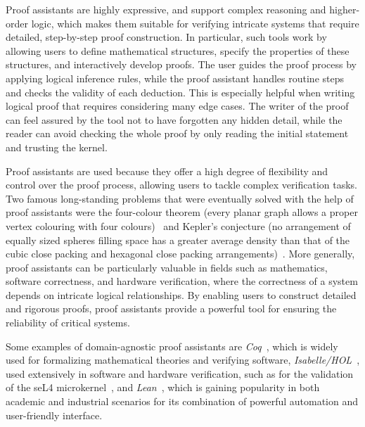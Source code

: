 Proof assistants are highly expressive, and support complex reasoning and higher-order logic, which makes them suitable for verifying intricate systems that require detailed, step-by-step proof construction. In particular, such tools work by allowing users to define mathematical structures, specify the properties of these structures, and interactively develop proofs. The user guides the proof process by applying logical inference rules, while the proof assistant handles routine steps and checks the validity of each deduction. This is especially helpful when writing logical proof that requires considering many edge cases. The writer of the proof can feel assured by the tool not to have forgotten any hidden detail, while the reader can avoid checking the whole proof by only reading the initial statement and trusting the kernel.

Proof assistants are used because they offer a high degree of flexibility and control over the proof process, allowing users to tackle complex verification tasks. Two famous long-standing problems that were eventually solved with the help of proof assistants were the four-colour theorem (every planar graph allows a proper vertex colouring with four colours)~\cite{fourcolor} and Kepler's conjecture (no arrangement of equally sized spheres filling space has a greater average density than that of the cubic close packing and hexagonal close packing arrangements)~\cite{keplerconjecture}. More generally, proof assistants can be particularly valuable in fields such as mathematics, software correctness, and hardware verification, where the correctness of a system depends on intricate logical relationships. By enabling users to construct detailed and rigorous proofs, proof assistants provide a powerful tool for ensuring the reliability of critical systems.

Some examples of domain-agnostic proof assistants are \textit{Coq}~\cite{coq}, which is widely used for formalizing mathematical theories and verifying software, \textit{Isabelle/HOL}~\cite{isabelle}, used extensively in software and hardware verification, such as for the validation of the seL4 microkernel~\cite{seL4proof}, and \textit{Lean}~\cite{lean}, which is gaining popularity in both academic and industrial scenarios for its combination of powerful automation and user-friendly interface.

